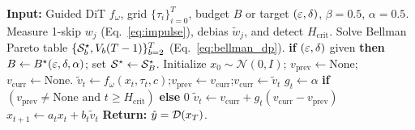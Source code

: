 \begin{algorithm}[t]
\caption{\method{}: Certified Synthesis \& Phase-Gated Shrinkage}
\label{alg:mpcache}
\begin{algorithmic}[1]
\STATE \textbf{Input:} Guided DiT $f_\omega$, grid $\{\tau_i\}_{i=0}^T$, budget $B$ or target $(\varepsilon, \delta)$, $\beta = 0.5$, $\alpha = 0.5$.
\STATE Measure 1-skip $w_j$ (Eq.~\ref{eq:impulse}), debias $\tilde{w}_j$, and detect $H_{\mathrm{crit}}$.
\STATE Solve Bellman Pareto table $\{\mathcal{S}_b^\star, V_b(T-1)\}_{b=2}^T$ (Eq.~\ref{eq:bellman_dp}).
\STATE \textbf{if} $(\varepsilon, \delta)$ given \textbf{then} $B \leftarrow B^\star(\varepsilon, \delta, \alpha)$;\; set $\mathcal{S}^\star \leftarrow \mathcal{S}_B^\star$.
\STATE Initialize $x_0 \sim \mathcal{N}(0, I)$;\; $v_{\mathrm{prev}} \leftarrow \mathrm{None}$;\; $v_{\mathrm{curr}} \leftarrow \mathrm{None}$.
        \STATE $\tilde{v}_t \leftarrow f_\omega(x_t, \tau_t, c)$;\quad $v_{\mathrm{prev}} \leftarrow v_{\mathrm{curr}}$;\quad $v_{\mathrm{curr}} \leftarrow \tilde{v}_t$
    \ELSE
        \STATE $g_t \leftarrow \alpha$ \textbf{if} $(v_{\mathrm{prev}} \neq \mathrm{None} \text{ and } t \ge H_{\mathrm{crit}})$ \textbf{else} $0$
        \STATE $\tilde{v}_t \leftarrow v_{\mathrm{curr}} + g_t(v_{\mathrm{curr}} - v_{\mathrm{prev}})$
    \ENDIF
    \STATE $x_{t+1} \leftarrow a_t x_t + b_t \tilde{v}_t$ 
\ENDFOR
\STATE \textbf{Return:} $\hat{y} = \mathcal{D}(x_T)$.
\end{algorithmic}
\end{algorithm}
